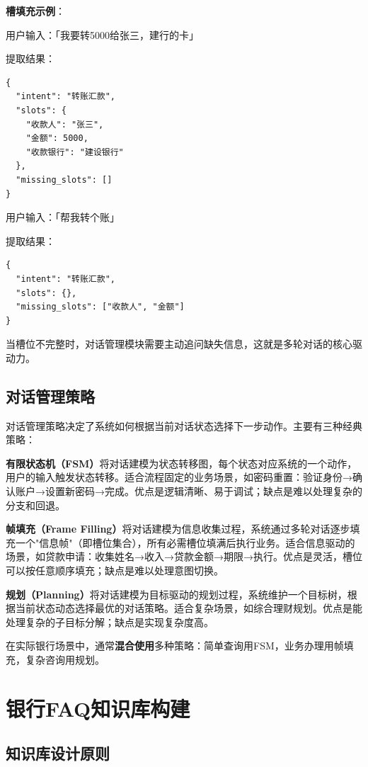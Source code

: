 \textbf{槽填充示例}：

用户输入：「我要转5000给张三，建行的卡」

提取结果：
\begin{lstlisting}[style=json]
{
  "intent": "转账汇款",
  "slots": {
    "收款人": "张三",
    "金额": 5000,
    "收款银行": "建设银行"
  },
  "missing_slots": []
}
\end{lstlisting}

用户输入：「帮我转个账」

提取结果：
\begin{lstlisting}[style=json]
{
  "intent": "转账汇款",
  "slots": {},
  "missing_slots": ["收款人", "金额"]
}
\end{lstlisting}

当槽位不完整时，对话管理模块需要主动追问缺失信息，这就是多轮对话的核心驱动力。

\subsection{对话管理策略}

对话管理策略决定了系统如何根据当前对话状态选择下一步动作。主要有三种经典策略：

\textbf{有限状态机（FSM）}将对话建模为状态转移图，每个状态对应系统的一个动作，用户的输入触发状态转移。适合流程固定的业务场景，如密码重置：验证身份→确认账户→设置新密码→完成。优点是逻辑清晰、易于调试；缺点是难以处理复杂的分支和回退。

\textbf{帧填充（Frame Filling）}将对话建模为信息收集过程，系统通过多轮对话逐步填充一个"信息帧"（即槽位集合），所有必需槽位填满后执行业务。适合信息驱动的场景，如贷款申请：收集姓名→收入→贷款金额→期限→执行。优点是灵活，槽位可以按任意顺序填充；缺点是难以处理意图切换。

\textbf{规划（Planning）}将对话建模为目标驱动的规划过程，系统维护一个目标树，根据当前状态动态选择最优的对话策略。适合复杂场景，如综合理财规划。优点是能处理复杂的子目标分解；缺点是实现复杂度高。

在实际银行场景中，通常\textbf{混合使用}多种策略：简单查询用FSM，业务办理用帧填充，复杂咨询用规划。

\section{银行FAQ知识库构建}

\subsection{知识库设计原则}

